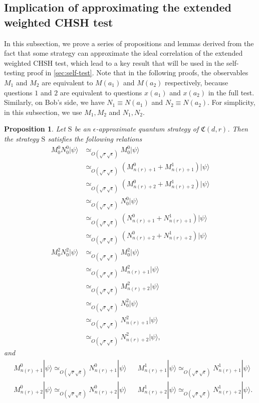 \documentclass[11pt,letterpaper]{article}
\newcommand{\ket}[1]{|#1\rangle}
\newcommand{\1}{\mathbb{1}}
\newcommand{\nr}{n(r)}
\newcommand{\fC}{\mathfrak{C}}
\newcommand{\bS}{\mathrm{S}}
\newcommand{\ep}{\epsilon}
\newcommand{\se}{\sqrt{\epsilon}}
\newcommand{\sr}{\sqrt{r}}
\newcommand{\appd}[1]{\simeq_{#1}}
\newtheorem{proposition}[theorem]{Proposition}
\theoremstyle{definition}
\begin{document}
\subsection{Implication of approximating the extended weighted CHSH test}
\label{sec:imp_chsh}
In this subsection, we prove a series of propositions and lemmas 
derived from the fact that some strategy can approximate the ideal correlation of the extended weighted CHSH test,
which lead to a key result that will be
used in the self-testing proof in \cref{sec:self-test}.
Note that in the following proofs, the observables $M_1$ and $M_2$ are
equivalent to $M(a_1)$ and $M(a_2)$ respectively, because questions $1$ 
and $2$ are equivalent to questions $x(a_1)$ and $x(a_2)$ in the full test.
Similarly, on Bob's side, we have $N_1 \equiv N(a_1)$ and $N_2 \equiv N(a_2)$.
For simplicity, in this subsection, we
use $M_1, M_2$ and $N_1, N_2$.
\begin{proposition}
\label{prop:chsh_base}
Let $\bS$ be an $\ep$-approximate quantum strategy of $\fC(d,r)$.
Then the strategy $\bS$ satisfies the following relations
\begin{align*}
	  M_0^0 N_0^0 \ket{\psi}
	  &\appd{O( \sr \se)}M_0^0 \ket{\psi}\\
	  &\appd{O( \sr \se)} (M_{\nr+1}^0+M_{\nr+1}^1)\ket{\psi}\\
	  &\appd{O( \sr \se)} (M_{\nr+2}^0+M_{\nr+2}^1)\ket{\psi} \\
	  &\appd{O( \sr \se)} N_0^0 \ket{\psi}\\
	  &\appd{O( \sr \se)} (N_{\nr+1}^0+N_{\nr+1}^1)\ket{\psi}\\
	  &\appd{O( \sr \se)} (N_{\nr+2}^0+N_{\nr+2}^1)\ket{\psi}\\
	M_0^2 N_0^2\ket{\psi}&\appd{O( \sr \se)} M_0^2 \ket{\psi}\\
	&\appd{O( \sr \se)} M_{\nr+1}^2 \ket{\psi}\\
	&\appd{O( \sr \se)} M_{\nr+2}^2 \ket{\psi}\\
	&\appd{O( \sr \se)} N_0^2 \ket{\psi}\\
	&\appd{O( \sr \se)} N_{\nr+1}^2 \ket{\psi}\\
	&\appd{O( \sr \se)} N_{\nr+2}^2 \ket{\psi},
\end{align*}
and
\begin{align*}
&M_{\nr+1}^0 \ket{\psi} \appd{O( \sr \se)} N_{\nr+1}^0 \ket{\psi} && M_{\nr+1}^1\ket{\psi} \appd{O( \sr \se)} N_{\nr+1}^1 \ket{\psi}\\
&M_{\nr+2}^0 \ket{\psi} \appd{O( \sr \se)} N_{\nr+2}^0 \ket{\psi} && M_{\nr+2}^1\ket{\psi} \appd{O( \sr \se)} N_{\nr+2}^1 \ket{\psi}.
\end{align*}
\end{proposition}
\end{document}
